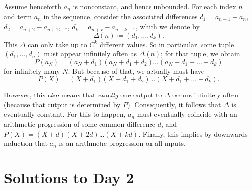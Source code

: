 Assume henceforth $a_n$ is nonconstant, and hence unbounded.
For each index $n$ and term $a_n$ in the sequence,
consider the associated differences
$d_1 = a_{n+1} - a_n$, $d_2 = a_{n+2} - a_{n+1}$, \dots, $d_k = a_{n+k}-a_{n+k-1}$,
which we denote by
\[ \Delta(n) \coloneqq (d_1, \dots, d_k).\]
This $\Delta$ can only take up to $C^k$ different values.
So in particular, some tuple $(d_1, \dots, d_n)$
must appear infinitely often as $\Delta(n)$; for that tuple, we obtain
\[ P(a_N) = (a_N+d_1)(a_N+d_1+d_2) \dots (a_N+d_1+\dots+d_k) \]
for infinitely many $N$.
But because of that, we actually must have
\[ P(X) = (X+d_1)(X+d_1+d_2) \dots (X+d_1+\dots+d_k). \]

However, this \emph{also} means that \emph{exactly} one output to $\Delta$
occurs infinitely often (because that output is determined by $P$).
Consequently, it follows that $\Delta$ is eventually constant.
For this to happen, $a_n$ must eventually coincide with an arithmetic
progression of some common difference $d$,
and $P(X) = (X+d)(X+2d) \dots (X+kd)$.
Finally, this implies by downwards induction that $a_n$ is
an arithmetic progression on all inputs.
\pagebreak

\section{Solutions to Day 2}